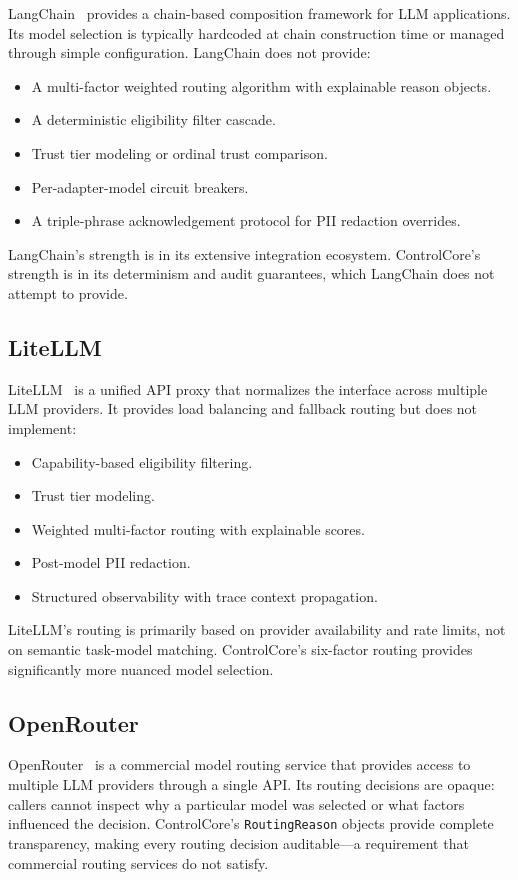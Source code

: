 \documentclass[11pt,a4paper]{article}
\theoremstyle{plain}
\theoremstyle{definition}
\begin{document}
LangChain~\cite{langchain} provides a chain-based composition framework for LLM
applications. Its model selection is typically hardcoded at chain construction
time or managed through simple configuration. LangChain does not provide:
\begin{itemize}[leftmargin=2em]
\item A multi-factor weighted routing algorithm with explainable reason objects.
\item A deterministic eligibility filter cascade.
\item Trust tier modeling or ordinal trust comparison.
\item Per-adapter-model circuit breakers.
\item A triple-phrase acknowledgement protocol for PII redaction overrides.
\end{itemize}

LangChain's strength is in its extensive integration ecosystem. ControlCore's
strength is in its determinism and audit guarantees, which LangChain does not
attempt to provide.

\subsection{LiteLLM}

LiteLLM~\cite{litellm} is a unified API proxy that normalizes the interface
across multiple LLM providers. It provides load balancing and fallback routing
but does not implement:
\begin{itemize}[leftmargin=2em]
\item Capability-based eligibility filtering.
\item Trust tier modeling.
\item Weighted multi-factor routing with explainable scores.
\item Post-model PII redaction.
\item Structured observability with trace context propagation.
\end{itemize}

LiteLLM's routing is primarily based on provider availability and rate limits,
not on semantic task-model matching. ControlCore's six-factor routing provides
significantly more nuanced model selection.

\subsection{OpenRouter}

OpenRouter~\cite{openrouter} is a commercial model routing service that provides
access to multiple LLM providers through a single API. Its routing decisions are
opaque: callers cannot inspect why a particular model was selected or what
factors influenced the decision. ControlCore's \texttt{RoutingReason} objects
provide complete transparency, making every routing decision auditable---a
requirement that commercial routing services do not satisfy.
\end{document}
